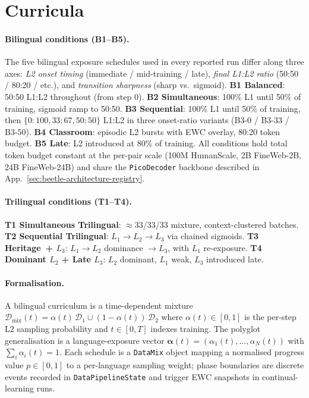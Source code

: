 \section{\beetle{} Curricula}\label{sec:beetle-curricula}

\paragraph{Bilingual conditions (B1--B5).} The five bilingual exposure schedules used in every reported run differ along three axes: \emph{L2 onset timing} (immediate / mid-training / late), \emph{final L1:L2 ratio} (50:50 / 80:20 / etc.), and \emph{transition sharpness} (sharp vs.\ sigmoid). \textbf{B1 Balanced}: 50:50 L1:L2 throughout (from step 0). \textbf{B2 Simultaneous}: 100\% L1 until 50\% of training, sigmoid ramp to 50:50. \textbf{B3 Sequential}: 100\% L1 until 50\% of training, then $\{0:100, 33:67, 50:50\}$ L1:L2 in three onset-ratio variants (B3-0 / B3-33 / B3-50). \textbf{B4 Classroom}: episodic L2 bursts with EWC overlay, 80:20 token budget. \textbf{B5 Late}: L2 introduced at 80\% of training. All conditions hold total token budget constant at the per-pair scale (100M HumanScale, 2B FineWeb-2B, 24B FineWeb-24B) and share the \texttt{PicoDecoder} backbone described in App.~\ref{sec:beetle-architecture-registry}.

\paragraph{Trilingual conditions (T1--T4).} \textbf{T1 Simultaneous Trilingual}: $\approx$33/33/33 mixture, context-clustered batches. \textbf{T2 Sequential Trilingual}: $L_1\to L_2\to L_3$ via chained sigmoids. \textbf{T3 Heritage~+ $L_3$}: $L_1\to L_2$ dominance $\to L_3$, with $L_1$ re-exposure. \textbf{T4 Dominant $L_2$ + Late $L_3$}: $L_2$ dominant, $L_1$ weak, $L_3$ introduced late. 

\paragraph{Formalisation.} A bilingual curriculum is a time-dependent mixture $\mathcal{D}_{\text{mix}}(t) = \alpha(t)\,\mathcal{D}_1 \cup (1-\alpha(t))\,\mathcal{D}_2$ where $\alpha(t)\in[0,1]$ is the per-step L2 sampling probability and $t\in[0,T]$ indexes training. The polyglot generalisation is a language-exposure vector $\boldsymbol{\alpha}(t)=(\alpha_1(t),\ldots,\alpha_N(t))$ with $\sum_i \alpha_i(t)=1$. Each schedule is a \texttt{DataMix} object mapping a normalised progress value $p\in[0,1]$ to a per-language sampling weight; phase boundaries are discrete events recorded in \texttt{DataPipelineState} and trigger EWC snapshots in continual-learning runs.

